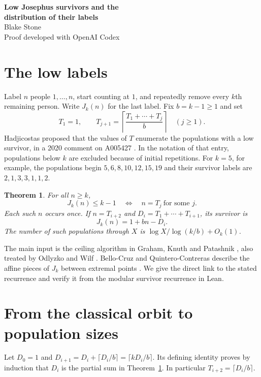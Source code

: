 \documentclass[11pt]{article}
\newtheorem{theorem}{Theorem}[section]
\newcommand{\ceil}[1]{\left\lceil#1\right\rceil}
\begin{document}
\begin{center}
{\LARGE\bfseries Low Josephus survivors and the\\[2pt] distribution of their labels}\\[7pt]
Blake Stone\\[-1pt]{\small Proof developed with OpenAI Codex}
\end{center}
\begin{abstract}
For step size $k\ge2$, Hadjicostas conjectured a partial-sum recurrence listing all population sizes $n\ge k$ for which the Josephus survivor has label at most $k-1$. We derive the recurrence and its label rule from the classical ceiling iteration. We also determine the lower, upper, and logarithmic densities with which the normalized survivor $J_k(n)/n$ lies below any fixed threshold.
\end{abstract}
\section{The low labels}
Label $n$ people $1,\ldots,n$, start counting at $1$, and repeatedly remove every $k$th remaining person. Write $J_k(n)$ for the last label. Fix $b=k-1\ge1$ and set
\[
 T_1=1,\qquad T_{j+1}=\ceil{\frac{T_1+\cdots+T_j}{b}}\quad(j\ge1).
\]
Hadjicostas proposed that the values of $T$ enumerate the populations with a low survivor, in a 2020 comment on A005427 \cite{oeis}. In the notation of that entry, populations below $k$ are excluded because of initial repetitions. For $k=5$, for example, the populations begin $5,6,8,10,12,15,19$ and their survivor labels are $2,1,3,3,1,1,2$.

\begin{theorem}\label{T}
For all $n\ge k$,
\[
 J_k(n)\le k-1 \quad\Longleftrightarrow\quad n=T_j\ \text{for some }j.
\]
Each such $n$ occurs once. If $n=T_{i+2}$ and $D_i=T_1+\cdots+T_{i+1}$, its survivor is
\[
 J_k(n)=1+bn-D_i.
\]
The number of such populations through $X$ is $\log X/\log(k/b)+O_k(1)$.
\end{theorem}
The main input is the ceiling algorithm in Graham, Knuth and Patashnik \cite[Sec.~3.3]{gkp}, also treated by Odlyzko and Wilf \cite{ow}. Bello-Cruz and Quintero-Contreras describe the affine pieces of $J_k$ between extremal points \cite{bello}. We give the direct link to the stated recurrence and verify it from the modular survivor recurrence in Lean.

\clearpage
\section{From the classical orbit to population sizes}
Let $D_0=1$ and $D_{i+1}=D_i+\lceil D_i/b\rceil=\lceil kD_i/b\rceil$. Its defining identity proves by induction that $D_i$ is the partial sum in Theorem~\ref{T}. In particular $T_{i+2}=\lceil D_i/b\rceil$.
\end{document}
